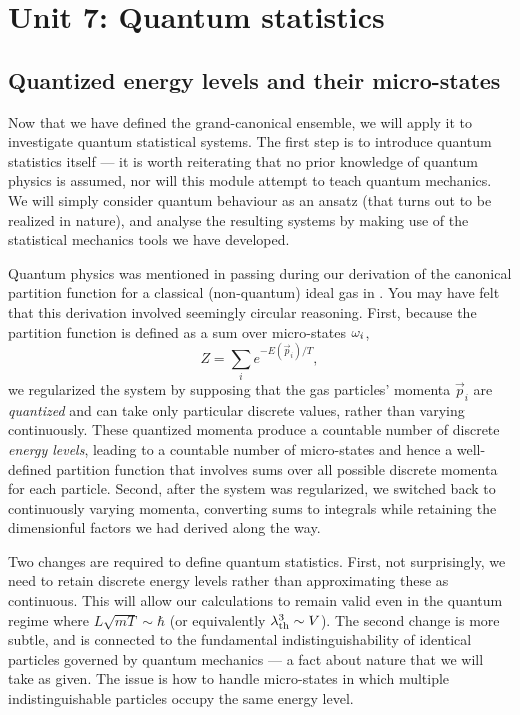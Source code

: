 \renewcommand{\thisunit}{MATH327 Unit 7}
\renewcommand{\moddate}{Last modified 17 Mar.~2025}
\setcounter{section}{7}
\setcounter{subsection}{0}
{}
\section*{Unit 7: Quantum statistics}
\subsection{\label{sec:quantum}Quantized energy levels and their micro-states}
Now that we have defined the grand-canonical ensemble, we will apply it to investigate quantum statistical systems.
The first step is to introduce quantum statistics itself --- it is worth reiterating that no prior knowledge of quantum physics is assumed, nor will this module attempt to teach quantum mechanics.
We will simply consider quantum behaviour as an ansatz (that turns out to be realized in nature), and analyse the resulting systems by making use of the statistical mechanics tools we have developed.

Quantum physics was mentioned in passing during our derivation of the canonical partition function for a classical (non-quantum) ideal gas in .
You may have felt that this derivation involved seemingly circular reasoning.
First, because the partition function is defined as a sum over micro-states $\omega_i$,
\begin{equation*}
  Z = \sum_i e^{-E(\vec{p}_i) / T},
\end{equation*}
we regularized the system by supposing that the gas particles' momenta $\vec{p}_i$ are \textit{quantized} and can take only particular discrete values, rather than varying continuously.
These quantized momenta produce a countable number of discrete \textit{energy levels}, leading to a countable number of micro-states and hence a well-defined partition function that involves sums over all possible discrete momenta for each particle.
Second, after the system was regularized, we switched back to continuously varying momenta, converting sums to integrals while retaining the dimensionful factors we had derived along the way.

Two changes are required to define quantum statistics.
First, not surprisingly, we need to retain discrete energy levels rather than approximating these as continuous.
This will allow our calculations to remain valid even in the quantum regime where $L\sqrt{mT} \sim \hbar$ (or equivalently $\lambda_{\mathrm{th}}^3 \sim V$).
The second change is more subtle, and is connected to the fundamental indistinguishability of identical particles governed by quantum mechanics --- a fact about nature that we will take as given.
The issue is how to handle micro-states in which multiple indistinguishable particles occupy the same energy level.

